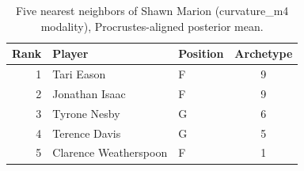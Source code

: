 \begin{table}[htbp]
  \centering\small
  \begin{tabular}{rllc}
    \toprule
    Rank & Player & Position & Archetype \\
    \midrule
    1 & Tari Eason & F & 9 \\
    2 & Jonathan Isaac & F & 9 \\
    3 & Tyrone Nesby & G & 6 \\
    4 & Terence Davis & G & 5 \\
    5 & Clarence Weatherspoon & F & 1 \\
    \bottomrule
  \end{tabular}
  \caption{Five nearest neighbors of Shawn Marion (curvature_m4 modality), Procrustes-aligned posterior mean.}
  \label{tab:Shawn_Marion_neighbors_curvature_m4}
\end{table}


